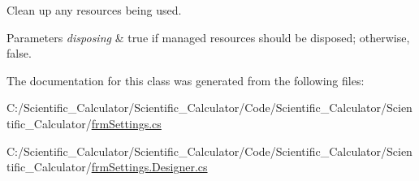 Clean up any resources being used. 


\begin{DoxyParams}{Parameters}
{\em disposing} & true if managed resources should be disposed; otherwise, false.\\
\hline
\end{DoxyParams}


The documentation for this class was generated from the following files\+:\begin{DoxyCompactItemize}
\item 
C\+:/\+Scientific\+\_\+\+Calculator/\+Scientific\+\_\+\+Calculator/\+Code/\+Scientific\+\_\+\+Calculator/\+Scientific\+\_\+\+Calculator/\hyperlink{frm_settings_8cs}{frm\+Settings.\+cs}\item 
C\+:/\+Scientific\+\_\+\+Calculator/\+Scientific\+\_\+\+Calculator/\+Code/\+Scientific\+\_\+\+Calculator/\+Scientific\+\_\+\+Calculator/\hyperlink{frm_settings_8_designer_8cs}{frm\+Settings.\+Designer.\+cs}\end{DoxyCompactItemize}

